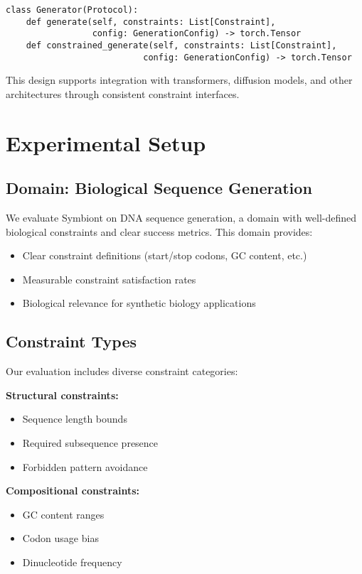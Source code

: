 \documentclass[conference]{IEEEtran}
\begin{document}
\begin{lstlisting}
class Generator(Protocol):
    def generate(self, constraints: List[Constraint],
                 config: GenerationConfig) -> torch.Tensor
    def constrained_generate(self, constraints: List[Constraint],
                           config: GenerationConfig) -> torch.Tensor
\end{lstlisting}

This design supports integration with transformers, diffusion models, and other architectures through consistent constraint interfaces.

\section{Experimental Setup}

\subsection{Domain: Biological Sequence Generation}

We evaluate Symbiont on DNA sequence generation, a domain with well-defined biological constraints and clear success metrics. This domain provides:

\begin{itemize}
    \item Clear constraint definitions (start/stop codons, GC content, etc.)
    \item Measurable constraint satisfaction rates
    \item Biological relevance for synthetic biology applications
\end{itemize}

\subsection{Constraint Types}

Our evaluation includes diverse constraint categories:

\textbf{Structural constraints:}
\begin{itemize}
    \item Sequence length bounds
    \item Required subsequence presence
    \item Forbidden pattern avoidance
\end{itemize}

\textbf{Compositional constraints:}
\begin{itemize}
    \item GC content ranges
    \item Codon usage bias
    \item Dinucleotide frequency
\end{itemize}
\end{document}
